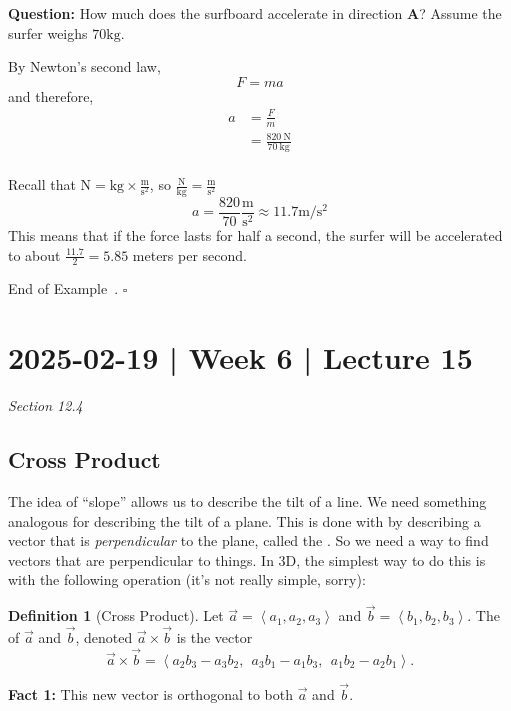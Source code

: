 \documentclass[10pt]{article}
\theoremstyle{definition}
\newtheorem{definition}[theorem]{Definition}
\newtheorem{example}[theorem]{Example}
\renewenvironment{example}
{\begin{oldexample}}
  {\par\smallskip\hfill   End of Example~\theexample. $\square$    \par\end{oldexample}}
\newcommand{\fl}{\noindent\textbf} %
\newcommand{\1}[1]{\textbf{1}_{\left[#1\right]}} %
\newcommand{\dempfcolor}[1]{{\color{RoyalBlue}#1}}
\newcommand{\demph}[1]{\dempfcolor{{\sl #1}}}
\begin{document}
\begin{example}
\textbf{Question:} How much does the surfboard accelerate in direction $\mathbf{A}$? Assume the surfer
weighs $70 \mbox{kg}$.

By Newton's second law,
\begin{equation*}
  F= ma
\end{equation*}
and therefore,
\begin{align*}
  a 
  &= \frac{F}{m}\\
  &= \frac{820\ \mathrm{N}}{70\ \mathrm{kg}}\\
\end{align*}

Recall that $\mathrm{N} = \mathrm{kg}\times \frac{\mathrm{m}}{\mathrm{s}^{2}}$, so
$\frac{\mathrm{N}}{\mathrm{kg}} = \frac{\mathrm{m}}{\mathrm{s}^{2}}$
\begin{equation*}
  a = \frac{820}{70} \frac{\mathrm{m}}{\mathrm{s}^{2}} \approx 11.7 \mathrm{m}/\mathrm{s}^{2}
\end{equation*}
This means that if the force lasts for half a second, the surfer will be accelerated to about
$\frac{11.7}{2} = 5.85$ meters per second.
  
\end{example}




\newpage
\section{2025-02-19 | Week 6 | Lecture 15}
\textit{Section 12.4}

\subsection{Cross Product}

The idea of ``slope'' allows us to describe the tilt of a line. We need something analogous for
describing the tilt of a plane. This is done with by describing a vector that is \textit{perpendicular}
to the plane, called the \demph{normal vector}. So we need a way to find vectors that are perpendicular
to things. In 3D, the simplest way to do this is with the following operation (it's not really simple,
sorry):

\begin{definition}[Cross Product]
  \label{def:cross-product}
  Let $\vec{a}=\left\langle a_{1},a_{2},a_{3} \right\rangle $ and $\vec{b} = \left\langle b_{1},b_{2},b_{3}
  \right\rangle$. The \demph{cross product} of $\vec{a}$ and $\vec{b}$, denoted $\vec{a}\times \vec{b}$ is the vector
  \begin{equation*}
    \vec{a} \times \vec{b} = \left\langle a_{2}b_{3}-a_{3}b_{2},\ \ a_{3}b_{1}-a_{1}b_{3},\ \ a_{1}b_{2}-a_{2}b_{1}\right\rangle.
  \end{equation*}
\end{definition}
\fl{Fact 1:} This new vector is orthogonal to both $\vec{a}$ and $\vec{b}$.
\end{document}
